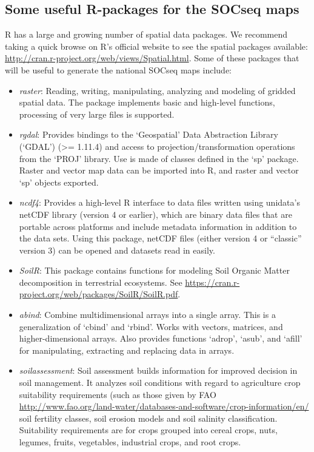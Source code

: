 \documentclass[
  10pt,
  b5paper,
]{book}
\providecommand{\tightlist}{%
  \setlength{\itemsep}{0pt}\setlength{\parskip}{0pt}}
\begin{document}
\hypertarget{some-useful-r-packages-for-the-socseq-maps}{%
\subsection{Some useful R-packages for the SOCseq maps}\label{some-useful-r-packages-for-the-socseq-maps}}

R has a large and growing number of spatial data packages. We recommend taking a quick browse on R's official website to see the spatial packages available: \url{http://cran.r-project.org/web/views/Spatial.html}. Some of these packages that will be useful to generate the national SOCseq maps include:

\begin{itemize}
\tightlist
\item
  \emph{raster}: Reading, writing, manipulating, analyzing and modeling of gridded spatial data. The package implements basic and high-level functions, processing of very large files is supported.
\item
  \emph{rgdal}: Provides bindings to the `Geospatial' Data Abstraction Library (`GDAL') (\textgreater= 1.11.4) and access to projection/transformation operations from the `PROJ' library. Use is made of classes defined in the `sp' package. Raster and vector map data can be imported into R, and raster and vector `sp' objects exported.
\item
  \emph{ncdf4}: Provides a high-level R interface to data files written using unidata's netCDF library (version 4 or earlier), which are binary data files that are portable across platforms and include metadata information in addition to the data sets. Using this package, netCDF files (either version 4 or ``classic'' version 3) can be opened and datasets read in easily.
\item
  \emph{SoilR}: This package contains functions for modeling Soil Organic Matter decomposition in terrestrial ecosystems. See \url{https://cran.r-project.org/web/packages/SoilR/SoilR.pdf}.
\item
  \emph{abind}: Combine multidimensional arrays into a single array. This is a generalization of `cbind' and `rbind'. Works with vectors, matrices, and higher-dimensional arrays. Also provides functions `adrop', `asub', and `afill' for manipulating, extracting and replacing data in arrays.
\item
  \emph{soilassessment}: Soil assessment builds information for improved decision in soil management. It analyzes soil conditions with regard to agriculture crop suitability requirements (such as those given by FAO \url{http://www.fao.org/land-water/databases-and-software/crop-information/en/} soil fertility classes, soil erosion models and soil salinity classification. Suitability requirements are for crops grouped into cereal crops, nuts, legumes, fruits, vegetables, industrial crops, and root crops.
\end{itemize}
\end{document}
